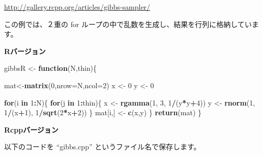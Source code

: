 \documentclass[]{book}
\newenvironment{Shaded}{\begin{snugshade}}{\end{snugshade}}
\newcommand{\ControlFlowTok}[1]{\textcolor[rgb]{0.13,0.29,0.53}{\textbf{#1}}}
\newcommand{\DataTypeTok}[1]{\textcolor[rgb]{0.13,0.29,0.53}{#1}}
\newcommand{\DecValTok}[1]{\textcolor[rgb]{0.00,0.00,0.81}{#1}}
\newcommand{\KeywordTok}[1]{\textcolor[rgb]{0.13,0.29,0.53}{\textbf{#1}}}
\newcommand{\NormalTok}[1]{#1}
\newcommand{\OperatorTok}[1]{\textcolor[rgb]{0.81,0.36,0.00}{\textbf{#1}}}
\newcommand{\StringTok}[1]{\textcolor[rgb]{0.31,0.60,0.02}{#1}}
\begin{document}
\url{http://gallery.rcpp.org/articles/gibbs-sampler/}

この例では、２重の for ループの中で乱数を生成し、結果を行列に格納しています。

\textbf{Rバージョン}

\begin{Shaded}
\begin{Highlighting}[]
\NormalTok{gibbsR <-}\StringTok{ }\ControlFlowTok{function}\NormalTok{(N,thin)\{}

\NormalTok{  mat<-}\KeywordTok{matrix}\NormalTok{(}\DecValTok{0}\NormalTok{,}\DataTypeTok{nrow=}\NormalTok{N,}\DataTypeTok{ncol=}\DecValTok{2}\NormalTok{)}
\NormalTok{  x <-}\StringTok{ }\DecValTok{0}
\NormalTok{  y <-}\StringTok{ }\DecValTok{0}

  \ControlFlowTok{for}\NormalTok{(i }\ControlFlowTok{in} \DecValTok{1}\OperatorTok{:}\NormalTok{N)\{}
    \ControlFlowTok{for}\NormalTok{(j }\ControlFlowTok{in} \DecValTok{1}\OperatorTok{:}\NormalTok{thin)\{}
\NormalTok{      x <-}\StringTok{ }\KeywordTok{rgamma}\NormalTok{(}\DecValTok{1}\NormalTok{, }\DecValTok{3}\NormalTok{, }\DecValTok{1}\OperatorTok{/}\NormalTok{(y}\OperatorTok{*}\NormalTok{y}\OperatorTok{+}\DecValTok{4}\NormalTok{))}
\NormalTok{      y <-}\StringTok{ }\KeywordTok{rnorm}\NormalTok{(}\DecValTok{1}\NormalTok{, }\DecValTok{1}\OperatorTok{/}\NormalTok{(x}\OperatorTok{+}\DecValTok{1}\NormalTok{), }\DecValTok{1}\OperatorTok{/}\KeywordTok{sqrt}\NormalTok{(}\DecValTok{2}\OperatorTok{*}\NormalTok{x}\OperatorTok{+}\DecValTok{2}\NormalTok{))}
\NormalTok{    \}}
\NormalTok{    mat[i,] <-}\StringTok{ }\KeywordTok{c}\NormalTok{(x,y)}
\NormalTok{  \}}
  \KeywordTok{return}\NormalTok{(mat)}
\NormalTok{\}}
\end{Highlighting}
\end{Shaded}

\textbf{Rcppバージョン}

以下のコードを ``gibbs.cpp'' というファイル名で保存します。
\end{document}
